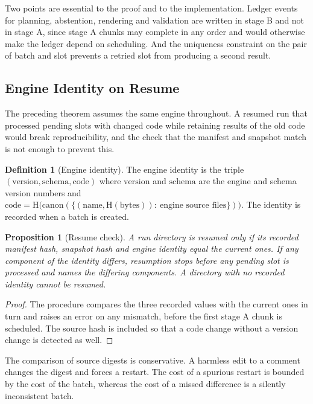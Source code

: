 \documentclass[11pt]{article}
\newtheorem{proposition}[theorem]{Proposition}
\theoremstyle{definition}
\newtheorem{definition}[theorem]{Definition}
\theoremstyle{remark}
\newcommand{\Hash}{\mathrm{H}}
\newcommand{\canon}{\mathrm{canon}}
\begin{document}
Two points are essential to the proof and to the implementation. Ledger events for planning, abstention, rendering and validation are written in stage B and not in stage A, since stage A chunks may complete in any order and would otherwise make the ledger depend on scheduling. And the uniqueness constraint on the pair of batch and slot prevents a retried slot from producing a second result.

\subsection{Engine Identity on Resume}

The preceding theorem assumes the same engine throughout. A resumed run that processed pending slots with changed code while retaining results of the old code would break reproducibility, and the check that the manifest and snapshot match is not enough to prevent this.

\begin{definition}[Engine identity]\label{def:engine}
The engine identity is the triple $(\mathrm{version},\mathrm{schema},\mathrm{code})$ where $\mathrm{version}$ and $\mathrm{schema}$ are the engine and schema version numbers and $\mathrm{code}=\Hash\bigl(\canon(\{(\mathrm{name},\Hash(\mathrm{bytes})):\ \text{engine source files}\})\bigr)$. The identity is recorded when a batch is created.
\end{definition}

\begin{proposition}[Resume check]\label{prop:resume}
A run directory is resumed only if its recorded manifest hash, snapshot hash and engine identity equal the current ones. If any component of the identity differs, resumption stops before any pending slot is processed and names the differing components. A directory with no recorded identity cannot be resumed.
\end{proposition}
\begin{proof}
The procedure compares the three recorded values with the current ones in turn and raises an error on any mismatch, before the first stage A chunk is scheduled. The source hash is included so that a code change without a version change is detected as well.
\end{proof}

The comparison of source digests is conservative. A harmless edit to a comment changes the digest and forces a restart. The cost of a spurious restart is bounded by the cost of the batch, whereas the cost of a missed difference is a silently inconsistent batch.
\end{document}
